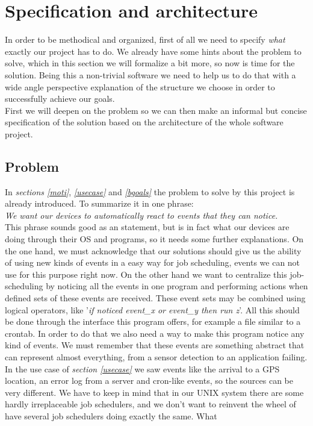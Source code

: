 \chapter{Specification and architecture}
In order to be methodical and organized, first of all we need to specify \emph{what} exactly our project has to do. We already have some 
hints about the problem to solve, which in this section we will formalize a bit more, so now is time for the solution. Being this a 
non-trivial software we need to help us to do that with a wide angle perspective explanation of the structure we choose in order to 
successfully achieve our goals.\\
First we will deepen on the problem so we can then make an informal but concise specification of the solution based on the architecture
of the whole software project.
\section{Problem}
In \emph{sections \ref{moti}}, \emph{\ref{usecase}} and \emph{\ref{bgoals}} the problem to solve by this project is already introduced. To 
summarize it in one phrase:\\
\emph{We want our devices to automatically react to events that they can notice.}\\
This phrase sounds good as an statement, but is in fact what our devices are doing through their OS and programs, so it needs some 
further explanations. On the one hand, we must acknowledge that our solutions should give us the ability of using new kinds of events in a 
easy way for job scheduling, events we can not use for this purpose right now. On the other hand we want to centralize this job-scheduling by
noticing all the events in one program and performing actions when defined sets of these events are received. These event sets may be 
combined using logical operators, like '\emph{if noticed event\_x or event\_y then run z}'. All this should be done through the 
interface this program offers, for example a file similar to a crontab. In order to do that we also need a way to make this program notice 
any kind of events. We must remember that these events are something abstract that can represent almost everything, from a sensor detection
to an application failing. In the use case of \emph{section \ref{usecase}} we saw events like the arrival to a GPS location, an error log 
from a server and cron-like events, so the sources can be very different. We have to keep in mind that in our UNIX system there are some
hardly irreplaceable job schedulers, and we don't want to reinvent the wheel of have several job schedulers doing exactly the same. What
